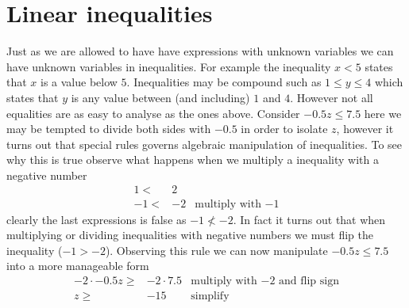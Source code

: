 \section{Linear inequalities}
Just as we are allowed to have have expressions with unknown variables
we can have unknown variables in inequalities. For example the inequality
$x < 5$ states that $x$ is a value below $5$. Inequalities may be compound
such as $1 \leq y \leq 4$ which states that $y$ is any value between (and
including) $1$ and $4$. However not all equalities are as easy to analyse
as the ones above. Consider $-0.5z \leq 7.5$ here we may be tempted to
divide both sides with $-0.5$ in order to isolate $z$, however it turns out
that special rules governs algebraic manipulation of inequalities. To see
why this is true observe what happens when we multiply a inequality with a
negative number
\begin{align*}
1  <& 2  &                             \\
-1 <& -2 & \textrm{multiply with $-1$}
\end{align*}
clearly the last expressions is false as $-1 \nless -2$. In fact it turns
out that when multiplying or dividing inequalities with negative numbers
we must flip the inequality ($-1 > -2$). Observing this rule we can now
manipulate $-0.5z \leq 7.5$ into a more manageable form
\begin{align*}
-2 \cdot -0.5z \geq& -2 \cdot 7.5 & \textrm{multiply with $-2$ and flip sign} \\
z              \geq& -15          & \textrm{simplify}
\end{align*}

